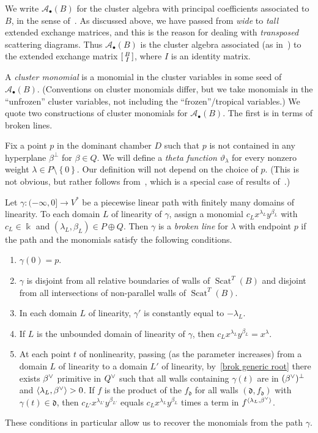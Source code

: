 \documentclass[ALCO,ThmDefs,Unicode,epreuves]{cedram}
\DeclareMathOperator{\Scat}{Scat}
\newcommand{\newword}[1]{\emph{#1}}
\newcommand{\thet}{\vartheta}
\newcommand{\set}[1]{{\left\lbrace #1 \right\rbrace}}
\newcommand{\br}[1]{{\langle #1 \rangle}}
\newcommand{\A}{{\mathcal A}}
\newcommand{\ck}{\spcheck}
\renewcommand{\k}{\Bbbk}
\renewcommand{\d}{{\mathfrak d}}
\begin{document}
We write $\A_\bullet(B)$ for the cluster algebra with principal coefficients associated to $B$, in the sense of~\cite[Definition~3.1]{ca4}.
As discussed above, we have passed from \emph{wide} to \emph{tall} extended exchange matrices, and this is the reason for dealing with \emph{transposed} scattering diagrams.
Thus $\A_\bullet(B)$ is the cluster algebra associated (as in~\cite[Definition~2.12]{ca4}) to the extended exchange matrix $\begin{bsmallmatrix}B\\I\end{bsmallmatrix}$, where $I$ is an identity matrix.

A \newword{cluster monomial} is a monomial in the cluster variables in some seed of $\A_\bullet(B)$.
(Conventions on cluster monomials differ, but we take monomials in the ``unfrozen'' cluster variables, not including the ``frozen''/tropical variables.)
We quote two constructions of cluster monomials for $\A_\bullet(B)$.
The first is in terms of broken lines.

Fix a point $p$ in the dominant chamber $D$ such that $p$ is not contained in any hyperplane $\beta^\perp$ for $\beta\in Q$.
We will define a \newword{theta function} $\thet_\lambda$ for every nonzero weight $\lambda\in P\setminus\set{0}$.
Our definition will not depend on the choice of $p$.
(This is not obvious, but rather follows from~\cite[Theorem~3.5]{GHKK}, which is a special case of results of~\cite[Section~4]{CPS}.)

Let $\gamma:(-\infty,0]\to V^*$ be a piecewise linear path with finitely many domains of linearity.
To each domain $L$ of linearity of $\gamma$, assign a monomial $c_Lx^{\lambda_L}y^{\beta_L}$ with $c_L\in\k$ and $(\lambda_L,\beta_L)\in P\oplus Q$.
Then $\gamma$ is a \newword{broken line} for $\lambda$ with endpoint $p$ if the path and the monomials satisfy the following conditions. 
\begin{enumerate}[label=(\roman*)]%
\item $\gamma(0)=p$.
\item \label{brok generic root}
$\gamma$ is disjoint from all relative boundaries of walls of $\Scat^T(B)$ and disjoint from all intersections of non-parallel walls of $\Scat^T(B)$. 
\item In each domain $L$ of linearity, $\gamma'$ is constantly equal to $-\lambda_L$.
\item If $L$ is the unbounded domain of linearity of $\gamma$, then $c_Lx^{\lambda_L}y^{\beta_L}=x^\lambda$.
\item \label{change slope}
At each point $t$ of nonlinearity, passing (as the parameter increases) from a domain $L$ of linearity to a domain $L'$ of linearity, by~\ref{brok generic root} there exists $\beta\ck$ primitive in $Q\ck$ such that all walls containing $\gamma(t)$ are in $(\beta\ck)^\perp$ and ${\br{\lambda_L,\beta\ck}>0}$.
If $f$ is the product of the $f_\d$ for all walls $(\d,f_\d)$ with $\gamma(t)\in\d$, then $c_{L'}x^{\lambda_{L'}}y^{\beta_{L'}}$ equals $c_Lx^{\lambda_L}y^{\beta_L}$ times a term in $f^{\br{\lambda_L,\beta\ck}}$.
\end{enumerate}
These conditions in particular allow us to recover the monomials from the path $\gamma$.
\end{document}
